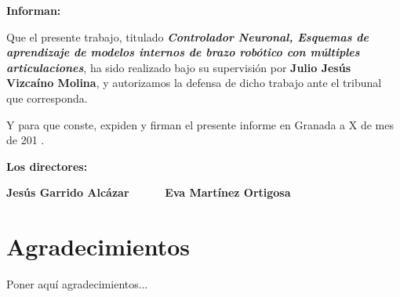 \vspace{0.5cm}

\textbf{Informan:}

\vspace{0.5cm}

Que el presente trabajo, titulado \textit{\textbf{Controlador Neuronal, Esquemas de aprendizaje de modelos internos de brazo robótico con múltiples articulaciones}}, ha sido realizado bajo su supervisión por \textbf{Julio Jesús Vizcaíno Molina}, y autorizamos la defensa de dicho trabajo ante el tribunal que corresponda.

\vspace{0.5cm}

Y para que conste, expiden y firman el presente informe en Granada a X de mes de 201 .

\vspace{1cm}

\textbf{Los directores:}

\vspace{5cm}

\noindent \textbf{Jesús Garrido Alcázar \ \ \ \ \ Eva Martínez Ortigosa}

\chapter*{Agradecimientos}
\thispagestyle{empty}

       \vspace{1cm}


Poner aquí agradecimientos...

